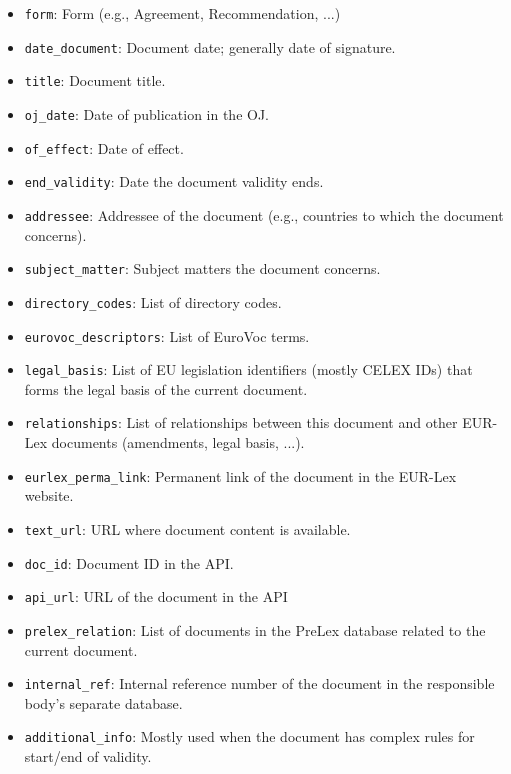 \documentclass[sigconf, authorversion]{acmart}
\begin{document}
\begin{itemize}
    \item \texttt{form}: Form (e.g., Agreement, Recommendation, ...)
    \item \texttt{date\_document}: Document date; generally date of signature.
    \item \texttt{title}: Document title.
    \item \texttt{oj\_date}: Date of publication in the OJ.
    \item \texttt{of\_effect}: Date of effect.
    \item \texttt{end\_validity}: Date the document validity ends.
    \item \texttt{addressee}: Addressee of the document (e.g., countries to which the document concerns).
    \item \texttt{subject\_matter}: Subject matters the document concerns.
    \item \texttt{directory\_codes}: List of directory codes.
    \item \texttt{eurovoc\_descriptors}: List of EuroVoc terms.
    \item \texttt{legal\_basis}: List of EU legislation identifiers (mostly CELEX IDs) that forms the legal basis of the current document.
    \item \texttt{relationships}: List of relationships between this document and other EUR-Lex documents (amendments, legal basis, ...).
    
    \item \texttt{eurlex\_perma\_link}: Permanent link of the document in the EUR-Lex website.

    \item \texttt{text\_url}: URL where document content is available.

    \item \texttt{doc\_id}: Document ID in the API.
    \item \texttt{api\_url}: URL of the document in the API
    \item \texttt{prelex\_relation}: List of documents in the PreLex database related to the current document.
    \item \texttt{internal\_ref}: Internal reference number of the document in the responsible body's separate database.
    \item \texttt{additional\_info}: Mostly used when the document has complex rules for start/end of validity.
\end{itemize}
\end{document}
